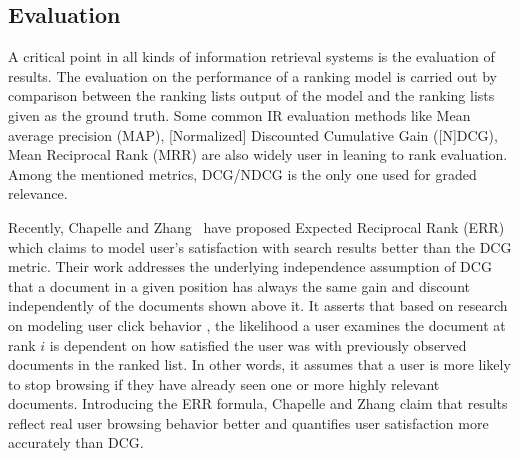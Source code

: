\subsection{Evaluation}

A critical point in all kinds of information retrieval systems is the evaluation of results. The evaluation on the performance of a ranking model is carried out by comparison between the ranking lists output of the model and the ranking lists given as the ground truth. Some common IR evaluation methods like Mean average precision (MAP), [Normalized] Discounted Cumulative Gain ([N]DCG), Mean Reciprocal Rank (MRR) are also widely user in leaning to rank evaluation. Among the mentioned metrics, DCG/NDCG is the only one used for graded relevance.

Recently, Chapelle and Zhang~\cite{l2r-err} have proposed Expected Reciprocal Rank (ERR) which claims to model user's satisfaction with search results better than the DCG metric. Their work addresses the underlying independence assumption of DCG that a document in a given position has always the same gain and discount independently of the documents shown above it. It asserts that based on research on modeling user click behavior \cite{l2r-clickmodel1,l2r-clickmodel2}, the likelihood a user examines the document at rank $i$ is dependent on how satisfied the user was with previously observed documents in the ranked list. In other words, it assumes that a user is more likely to stop browsing if they have already seen one or more highly relevant documents. Introducing the ERR formula, Chapelle and Zhang claim that results reflect real user browsing behavior better and quantifies user satisfaction more accurately than DCG.

